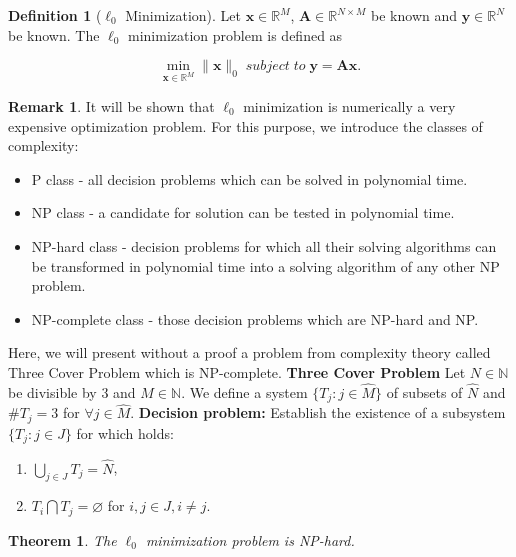 \documentclass[11pt,american]{book} %
\theoremstyle{plain}
\newtheorem{thm}{Theorem}
\theoremstyle{definition}
\newtheorem{defn}{Definition}
\newtheorem{rmrk}{Remark}
\begin{document}
\begin{defn}[$\ell_{0}$ Minimization]
	Let $\bm{x} \in \mathbb{R}^{M}$, $\bm{A} \in \mathbb{R}^{N \times M}$ be known and $\bm{y} \in \mathbb{R}^{N}$ be known. The $\ell_{0}$ minimization problem is defined as
	
	\begin{equation}
		\min_{\bm{{x}} \in \mathbb{R}^{M}}\lVert \bm{x}\rVert_{0} \;subject\; to\; \bm{y} = \bm{A} \bm{x}. \label{l0}
	\end{equation}
\end{defn}

\begin{rmrk}
	It will be shown that $\ell_{0}$ minimization is numerically a very expensive optimization problem. For this purpose, we introduce the classes of complexity:
	
	\begin{itemize}
		\item P class - all decision problems which can be solved in polynomial time.
		\item NP class - a candidate for solution can be tested in polynomial time.
		\item NP-hard class - decision problems for which all their solving algorithms can be transformed in polynomial time  into a solving algorithm of any other NP problem.
		\item NP-complete class - those decision problems which are NP-hard and NP.
	\end{itemize}
	Here, we will present without a proof a problem from complexity theory called Three Cover Problem which is NP-complete.
	\newline
	\textbf{Three Cover Problem}
	\newline
	Let $N \in \mathbb{N}$ be divisible by 3 and $M \in \mathbb{N}$. We define a system $\{T_j: j \in \hat{M}\}$ of subsets of $\hat{N}$ and $\#T_j = 3$ for $\forall j \in \hat{M}$. \textbf{Decision problem:} Establish the existence of a subsystem $\{T_j: j \in J\}$ for which holds:
	\begin{enumerate}
		\item $\bigcup_{j \in J} T_j = \hat{N}$,
		\item $T_i \bigcap T_j = \varnothing$ for $i,j \in J, i\neq j$.
	\end{enumerate}
	
\end{rmrk}
\begin{thm}
	The $\ell_{0}$ minimization problem is NP-hard.
\end{thm}
\end{document}

